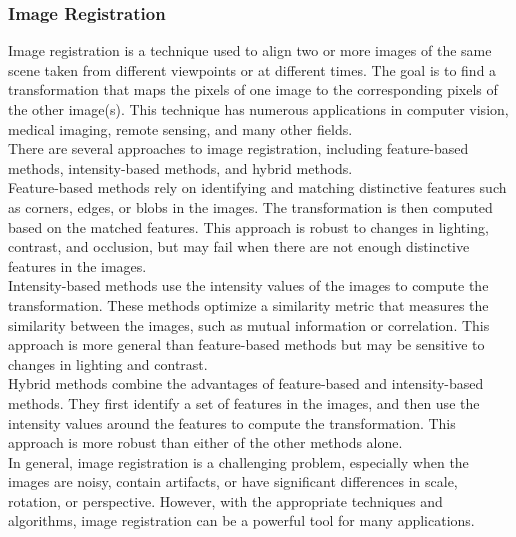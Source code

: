 \begin{multicols}{2}
\subsubsection{{{\fontsize{13}{17}\selectfont \textbf{Image Registration}}}}\cite{image_reg}
Image registration is a technique used to align two or more images of the same scene taken from different viewpoints or at different times. The goal is to find a transformation that maps the pixels of one image to the corresponding pixels of the other image(s). This technique has numerous applications in computer vision, medical imaging, remote sensing, and many other fields.\\
There are several approaches to image registration, including feature-based methods, intensity-based methods, and hybrid methods.\\
Feature-based methods rely on identifying and matching distinctive features such as corners, edges, or blobs in the images. The transformation is then computed based on the matched features. This approach is robust to changes in lighting, contrast, and occlusion, but may fail when there are not enough distinctive features in the images.\\
Intensity-based methods use the intensity values of the images to compute the transformation. These methods optimize a similarity metric that measures the similarity between the images, such as mutual information or correlation. This approach is more general than feature-based methods but may be sensitive to changes in lighting and contrast.\\
Hybrid methods combine the advantages of feature-based and intensity-based methods. They first identify a set of features in the images, and then use the intensity values around the features to compute the transformation. This approach is more robust than either of the other methods alone.\\
In general, image registration is a challenging problem, especially when the images are noisy, contain artifacts, or have significant differences in scale, rotation, or perspective. However, with the appropriate techniques and algorithms, image registration can be a powerful tool for many applications.

\vspace{0.5cm}

\end{multicols}
